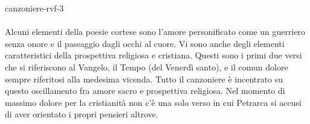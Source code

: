 \documentclass[preview]{standalone}
\begin{document}
\begin{snippet}{canzoniere-rvf-3}
    \\\\
    Alcuni elementi della poesie cortese sono l'amore personificato come un guerriero
    senza onore e il passaggio dagli occhi al cuore.
    Vi sono anche degli elementi caratteristici della prospettiva religiosa e cristiana.
    Questi sono i primi due versi che si riferiscono al Vangelo, il Tempo (del Venerdì santo),
    e il comun dolore sempre riferitosi alla medesima vicenda.
    Tutto il canzoniere è incentrato su questo oscillamento fra amore sacro e prospettiva religiosa.
    Nel momento di massimo dolore per la cristianità non c'è una solo verso in cui Petrarca si accusi di
    aver orientato i propri pensieri altrove.
\end{snippet}
\end{document}
